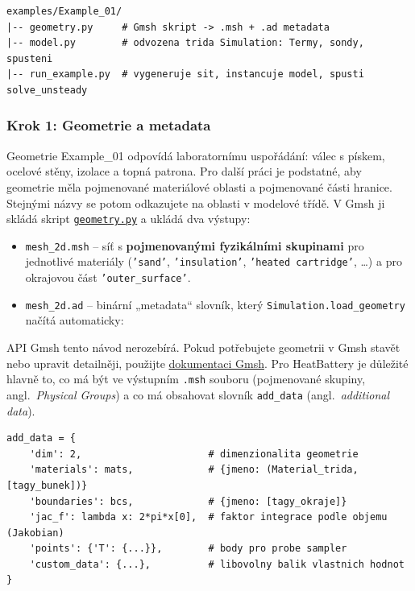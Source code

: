 \documentclass[a4paper,11pt]{article}
\newcommand{\GitHubExOneGeometryURL}{https://github.com/LiborKudela/heat-battery/blob/master/examples/Example_01/geometry.py}
\newcommand{\GitHubExOneGeometry}{\href{\GitHubExOneGeometryURL}{\texttt{geometry.py}}}
\begin{document}
\begin{lstlisting}[style=plain]
examples/Example_01/
|-- geometry.py     # Gmsh skript -> .msh + .ad metadata
|-- model.py        # odvozena trida Simulation: Termy, sondy, spusteni
|-- run_example.py  # vygeneruje sit, instancuje model, spusti solve_unsteady
\end{lstlisting}

\subsubsection*{Krok 1: Geometrie a metadata}

Geometrie Example\_01 odpovídá laboratornímu uspořádání: válec s pískem, ocelové
stěny, izolace a topná patrona. Pro další práci je podstatné, aby geometrie měla
pojmenované materiálové oblasti a pojmenované části hranice. Stejnými názvy se
potom odkazujete na oblasti v modelové třídě. V Gmsh ji skládá skript
\GitHubExOneGeometry{} a ukládá dva výstupy:

\begin{itemize}
  \item \texttt{mesh\_2d.msh} -- síť s \textbf{pojmenovanými fyzikálními
        skupinami} pro jednotlivé materiály (\texttt{'sand'},
        \texttt{'insulation'}, \texttt{'heated cartridge'}, \dots) a pro
        okrajovou část \texttt{'outer\_surface'}.
  \item \texttt{mesh\_2d.ad} -- binární „metadata“ slovník, který
        \texttt{Simulation.load\_geometry} načítá automaticky:
\end{itemize}

API Gmsh tento návod nerozebírá. Pokud potřebujete geometrii v Gmsh stavět nebo
upravit detailněji, použijte
\href{https://gmsh.info/doc/texinfo/gmsh.html}{dokumentaci Gmsh}. Pro HeatBattery
je důležité hlavně to, co má být ve výstupním \texttt{.msh} souboru
(pojmenované skupiny, angl.\ \emph{Physical Groups}) a co má obsahovat slovník
\texttt{add\_data} (angl.\ \emph{additional data}).

\begin{lstlisting}[style=py]
add_data = {
    'dim': 2,                      # dimenzionalita geometrie
    'materials': mats,             # {jmeno: (Material_trida, [tagy_bunek])}
    'boundaries': bcs,             # {jmeno: [tagy_okraje]}
    'jac_f': lambda x: 2*pi*x[0],  # faktor integrace podle objemu (Jakobian)
    'points': {'T': {...}},        # body pro probe sampler
    'custom_data': {...},          # libovolny balik vlastnich hodnot
}
\end{lstlisting}
\end{document}
